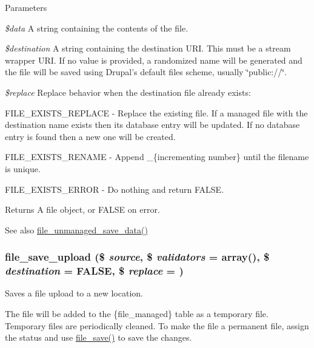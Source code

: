 \begin{DoxyParams}{Parameters}
\item[{\em \$data}]A string containing the contents of the file. \item[{\em \$destination}]A string containing the destination URI. This must be a stream wrapper URI. If no value is provided, a randomized name will be generated and the file will be saved using Drupal's default files scheme, usually \char`\"{}public://\char`\"{}. \item[{\em \$replace}]Replace behavior when the destination file already exists:
\begin{DoxyItemize}
\item FILE\_\-EXISTS\_\-REPLACE -\/ Replace the existing file. If a managed file with the destination name exists then its database entry will be updated. If no database entry is found then a new one will be created.
\item FILE\_\-EXISTS\_\-RENAME -\/ Append \_\-\{incrementing number\} until the filename is unique.
\item FILE\_\-EXISTS\_\-ERROR -\/ Do nothing and return FALSE.
\end{DoxyItemize}\end{DoxyParams}
\begin{DoxyReturn}{Returns}
A file object, or FALSE on error.
\end{DoxyReturn}
\begin{DoxySeeAlso}{See also}
\hyperlink{group__file_gac2d047d4471ec93803f584cda01a557c}{file\_\-unmanaged\_\-save\_\-data()} 
\end{DoxySeeAlso}
\hypertarget{group__file_gaec0ce0fef696b3d4f9e0809c84bd8f41}{
\subsubsection[{file\_\-save\_\-upload}]{\setlength{\rightskip}{0pt plus 5cm}file\_\-save\_\-upload (\$ {\em source}, \/  \$ {\em validators} = {\ttfamily array()}, \/  \$ {\em destination} = {\ttfamily FALSE}, \/  \$ {\em replace} = {})}}
\label{group__file_gaec0ce0fef696b3d4f9e0809c84bd8f41}
Saves a file upload to a new location.

The file will be added to the \{file\_\-managed\} table as a temporary file. Temporary files are periodically cleaned. To make the file a permanent file, assign the status and use \hyperlink{group__file_ga80327cb23d8d384b827b2637cd8cc4ba}{file\_\-save()} to save the changes.


